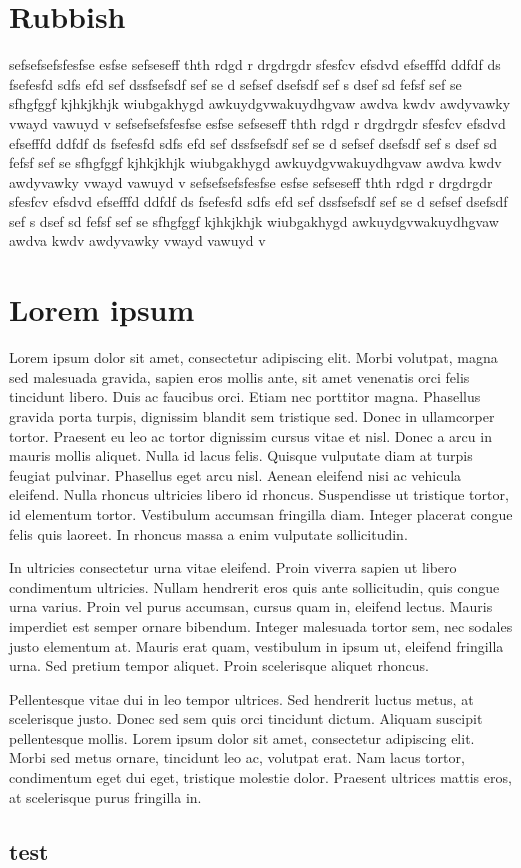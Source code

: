 \documentclass[a4paper]{article}
\begin{document}
\section{Rubbish}
sefsefsefsfesfse esfse sefseseff  thth rdgd r drgdrgdr  sfesfcv efsdvd  efsefffd ddfdf
ds fsefesfd sdfs efd sef dssfsefsdf sef se d sefsef dsefsdf sef s dsef sd fefsf sef se 
sfhgfggf kjhkjkhjk wiubgakhygd awkuydgvwakuydhgvaw awdva kwdv awdyvawky vwayd vawuyd v
sefsefsefsfesfse esfse sefseseff  thth rdgd r drgdrgdr  sfesfcv efsdvd  efsefffd ddfdf
ds fsefesfd sdfs efd sef dssfsefsdf sef se d sefsef dsefsdf sef s dsef sd fefsf sef se 
sfhgfggf kjhkjkhjk wiubgakhygd awkuydgvwakuydhgvaw awdva kwdv awdyvawky vwayd vawuyd v
sefsefsefsfesfse esfse sefseseff  thth rdgd r drgdrgdr  sfesfcv efsdvd  efsefffd ddfdf
ds fsefesfd sdfs efd sef dssfsefsdf sef se d sefsef dsefsdf sef s dsef sd fefsf sef se 
sfhgfggf kjhkjkhjk wiubgakhygd awkuydgvwakuydhgvaw awdva kwdv awdyvawky vwayd vawuyd v

\section{Lorem ipsum}
Lorem ipsum dolor sit amet, consectetur adipiscing elit. Morbi volutpat, magna sed malesuada gravida, sapien eros mollis ante, sit amet venenatis orci felis tincidunt libero. Duis ac faucibus orci. Etiam nec porttitor magna. Phasellus gravida porta turpis, dignissim blandit sem tristique sed. Donec in ullamcorper tortor. Praesent eu leo ac tortor dignissim cursus vitae et nisl. Donec a arcu in mauris mollis aliquet. Nulla id lacus felis. Quisque vulputate diam at turpis feugiat pulvinar. Phasellus eget arcu nisl. Aenean eleifend nisi ac vehicula eleifend. Nulla rhoncus ultricies libero id rhoncus. Suspendisse ut tristique tortor, id elementum tortor. Vestibulum accumsan fringilla diam. Integer placerat congue felis quis laoreet. In rhoncus massa a enim vulputate sollicitudin.

In ultricies consectetur urna vitae eleifend. Proin viverra sapien ut libero condimentum ultricies. Nullam hendrerit eros quis ante sollicitudin, quis congue urna varius. Proin vel purus accumsan, cursus quam in, eleifend lectus. Mauris imperdiet est semper ornare bibendum. Integer malesuada tortor sem, nec sodales justo elementum at. Mauris erat quam, vestibulum in ipsum ut, eleifend fringilla urna. Sed pretium tempor aliquet. Proin scelerisque aliquet rhoncus.

Pellentesque vitae dui in leo tempor ultrices. Sed hendrerit luctus metus, at scelerisque justo. Donec sed sem quis orci tincidunt dictum. Aliquam suscipit pellentesque mollis. Lorem ipsum dolor sit amet, consectetur adipiscing elit. Morbi sed metus ornare, tincidunt leo ac, volutpat erat. Nam lacus tortor, condimentum eget dui eget, tristique molestie dolor. Praesent ultrices mattis eros, at scelerisque purus fringilla in. 

\subsection{test}
\end{document}
